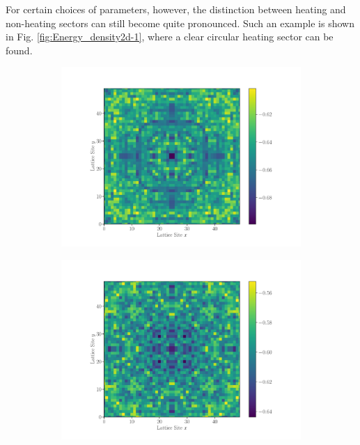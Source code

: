 \documentclass[11pt, a4paper, oneside]{book}
\theoremstyle{definition} %
\begin{document}
 For certain choices of parameters, however, the distinction between heating and non-heating sectors can still become quite pronounced.  Such an example is shown in Fig. \ref{fig:Energy_density2d-1}, where a clear circular heating sector can be found.

\begin{figure}[h]
\begin{subfigure}{.5\textwidth}
  \centering
  \includegraphics[width=\linewidth]{heatmapED_2D-heating1.pdf}
  \caption{}
\end{subfigure}
\begin{subfigure}{.5\textwidth}
  \centering
  \includegraphics[width=\linewidth]{heatmapED_2D-heating2.pdf}  
  \caption{}
\end{subfigure}

\end{figure}
\end{document}
